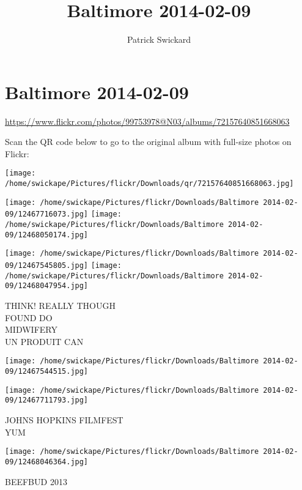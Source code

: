 \documentclass[10pt,letterpaper]{article}
\title{Baltimore 2014-02-09}
\author{Patrick Swickard}
\date{}
\begin{document}
\section*{Baltimore 2014-02-09}

\url{https://www.flickr.com/photos/99753978@N03/albums/72157640851668063}

Scan the QR code below to go to the original album with full-size photos on Flickr:

\texttt{[image: /home/swickape/Pictures/flickr/Downloads/qr/72157640851668063.jpg]}
\pagebreak

\texttt{[image: /home/swickape/Pictures/flickr/Downloads/Baltimore 2014-02-09/12467716073.jpg]}
\texttt{[image: /home/swickape/Pictures/flickr/Downloads/Baltimore 2014-02-09/12468050174.jpg]}

\texttt{[image: /home/swickape/Pictures/flickr/Downloads/Baltimore 2014-02-09/12467545805.jpg]}
\texttt{[image: /home/swickape/Pictures/flickr/Downloads/Baltimore 2014-02-09/12468047954.jpg]}

THINK!  REALLY THOUGH\\
FOUND DO\\
MIDWIFERY\\
UN PRODUIT CAN
\pagebreak

\texttt{[image: /home/swickape/Pictures/flickr/Downloads/Baltimore 2014-02-09/12467544515.jpg]}

\vspace{0.25in}
\texttt{[image: /home/swickape/Pictures/flickr/Downloads/Baltimore 2014-02-09/12467711793.jpg]}

JOHNS HOPKINS FILMFEST\\
YUM
\pagebreak

\texttt{[image: /home/swickape/Pictures/flickr/Downloads/Baltimore 2014-02-09/12468046364.jpg]}

BEEFBUD 2013
\pagebreak
\end{document}
